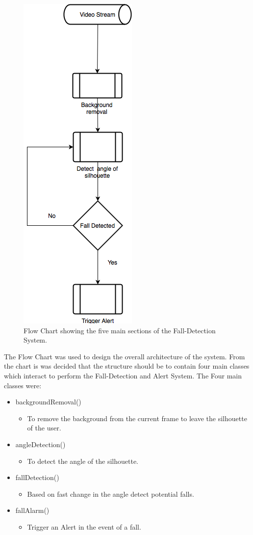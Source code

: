 \documentclass[11pt,a4paper]{report}
\begin{document}
\begin{figure}[H]
 \centering
 \includegraphics[scale = 0.4]{basicFlowChart.png}
 \caption{Flow Chart showing the five main sections of the Fall-Detection System.}
 \label{fig:basicFlowChart}
\end{figure}

\pagebreak
The Flow Chart was used to design the overall architecture of the system. From the chart is was decided that the structure should be to contain four main classes which interact to perform the Fall-Detection and Alert System. The Four main classes were:
\begin{itemize}
\item backgroundRemoval()
	\begin{itemize}
	\item To remove the background from the current frame to leave the silhouette of the user.
	\end{itemize}
\item angleDetection()
	\begin{itemize}
	\item To detect the angle of the silhouette.
	\end{itemize}
\item fallDetection()
	\begin{itemize}
	\item Based on fast change in the angle detect potential falls.
	\end{itemize}
\item fallAlarm()
	\begin{itemize}
	\item Trigger an Alert in the event of a fall.
	\end{itemize}
\end{itemize}
\end{document}

